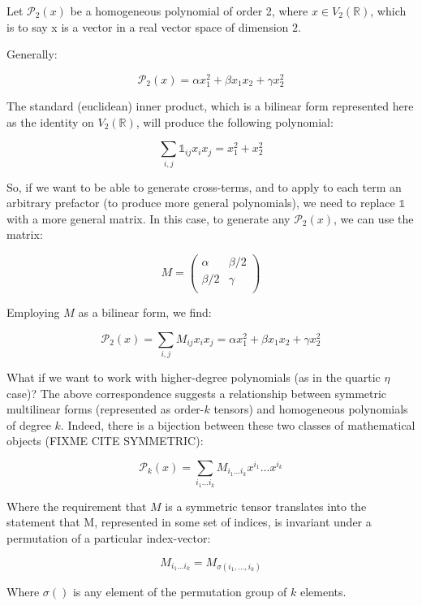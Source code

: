 \documentclass[10pt,letterpaper]{article}
\begin{document}
Let $\mathcal{P}_2(x)$ be a homogeneous polynomial of order 2, where $x\in V_2(\mathbb{R})$, which is to say x is a vector in a real vector space of dimension $2$.

Generally:

$$ \mathcal{P}_2(x) =  \alpha x_1^2 + \beta x_1 x_2 + \gamma x_2^2 $$

The standard (euclidean) inner product, which is a bilinear form represented here as the identity on $V_2(\mathbb{R})$, will produce the following polynomial:

$$ \sum_{i,j} \mathds{1}_{ij} x_i x_j = x_1^2 + x_2^2$$

So, if we want to be able to generate cross-terms, and to apply to each term an arbitrary prefactor (to produce more general polynomials), we need to replace $\mathds{1}$ with a more general matrix. In this case, to generate any $\mathcal{P}_2(x)$, we can use the matrix:


\[M = \left(\begin{array}{ccc}
\alpha & \beta/2 \\
\beta/2 & \gamma \\
\end{array} \right)\] 

Employing $M$ as a bilinear form, we find:

\begin{equation} \label{eq:bilinear_form}
\mathcal{P}_2(x) =  \sum_{i,j} M_{ij} x_i x_j = \alpha x_1^2 + \beta x_1 x_2 + \gamma x_2^2 
\end{equation}


What if we want to work with higher-degree polynomials (as in the quartic $\eta$ case)?
The above correspondence suggests a relationship between symmetric multilinear forms (represented as order-$k$ tensors) and homogeneous polynomials of degree $k$. Indeed, there is a bijection between these two classes of mathematical objects (FIXME CITE SYMMETRIC):

\begin{equation} \label{eq:multilinear_form}
\mathcal{P}_k(x) =  \sum_{i_1...i_k} M_{i_1...i_k} x^{i_1}...x^{i_k}
\end{equation}

Where the requirement that $M$ is a symmetric tensor translates into the statement that M, represented in some set of indices, is invariant under a permutation of a particular index-vector:

$$ M_{i_1...i_k} = M_{\sigma(i_1,...,i_k)}$$

Where $\sigma()$ is any element of the permutation group of $k$ elements.
\end{document}
